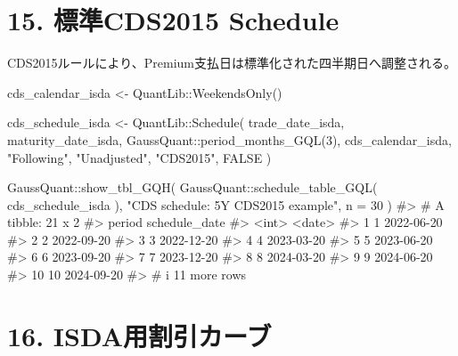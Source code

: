 \documentclass[
  letterpaper,
  DIV=11,
  numbers=noendperiod]{scrreprt}
\newenvironment{Shaded}{\begin{snugshade}}{\end{snugshade}}
\newcommand{\AttributeTok}[1]{\textcolor[rgb]{0.40,0.45,0.13}{#1}}
\newcommand{\CommentTok}[1]{\textcolor[rgb]{0.37,0.37,0.37}{#1}}
\newcommand{\ConstantTok}[1]{\textcolor[rgb]{0.56,0.35,0.01}{#1}}
\newcommand{\DecValTok}[1]{\textcolor[rgb]{0.68,0.00,0.00}{#1}}
\newcommand{\FunctionTok}[1]{\textcolor[rgb]{0.28,0.35,0.67}{#1}}
\newcommand{\NormalTok}[1]{\textcolor[rgb]{0.00,0.23,0.31}{#1}}
\newcommand{\OtherTok}[1]{\textcolor[rgb]{0.00,0.23,0.31}{#1}}
\newcommand{\SpecialCharTok}[1]{\textcolor[rgb]{0.37,0.37,0.37}{#1}}
\newcommand{\StringTok}[1]{\textcolor[rgb]{0.13,0.47,0.30}{#1}}
\begin{document}
\section{15. 標準CDS2015 Schedule}\label{ux6a19ux6e96cds2015-schedule}

CDS2015ルールにより、Premium支払日は標準化された四半期日へ調整される。

\begin{Shaded}
\begin{Highlighting}[]
\NormalTok{cds\_calendar\_isda }\OtherTok{\textless{}{-}}\NormalTok{ QuantLib}\SpecialCharTok{::}\FunctionTok{WeekendsOnly}\NormalTok{()}

\NormalTok{cds\_schedule\_isda }\OtherTok{\textless{}{-}}\NormalTok{ QuantLib}\SpecialCharTok{::}\FunctionTok{Schedule}\NormalTok{(}
\NormalTok{  trade\_date\_isda,}
\NormalTok{  maturity\_date\_isda,}
\NormalTok{  GaussQuant}\SpecialCharTok{::}\FunctionTok{period\_months\_GQL}\NormalTok{(}\DecValTok{3}\NormalTok{),}
\NormalTok{  cds\_calendar\_isda,}
  \StringTok{"Following"}\NormalTok{,}
  \StringTok{"Unadjusted"}\NormalTok{,}
  \StringTok{"CDS2015"}\NormalTok{,}
  \ConstantTok{FALSE}
\NormalTok{)}

\NormalTok{GaussQuant}\SpecialCharTok{::}\FunctionTok{show\_tbl\_GQH}\NormalTok{(}
\NormalTok{  GaussQuant}\SpecialCharTok{::}\FunctionTok{schedule\_table\_GQL}\NormalTok{(}
\NormalTok{    cds\_schedule\_isda}
\NormalTok{  ),}
  \StringTok{"CDS schedule: 5Y CDS2015 example"}\NormalTok{,}
  \AttributeTok{n =} \DecValTok{30}
\NormalTok{)}
\CommentTok{\#\textgreater{} \# A tibble: 21 x 2}
\CommentTok{\#\textgreater{}    period schedule\_date}
\CommentTok{\#\textgreater{}     \textless{}int\textgreater{} \textless{}date\textgreater{}       }
\CommentTok{\#\textgreater{}  1      1 2022{-}06{-}20   }
\CommentTok{\#\textgreater{}  2      2 2022{-}09{-}20   }
\CommentTok{\#\textgreater{}  3      3 2022{-}12{-}20   }
\CommentTok{\#\textgreater{}  4      4 2023{-}03{-}20   }
\CommentTok{\#\textgreater{}  5      5 2023{-}06{-}20   }
\CommentTok{\#\textgreater{}  6      6 2023{-}09{-}20   }
\CommentTok{\#\textgreater{}  7      7 2023{-}12{-}20   }
\CommentTok{\#\textgreater{}  8      8 2024{-}03{-}20   }
\CommentTok{\#\textgreater{}  9      9 2024{-}06{-}20   }
\CommentTok{\#\textgreater{} 10     10 2024{-}09{-}20   }
\CommentTok{\#\textgreater{} \# i 11 more rows}
\end{Highlighting}
\end{Shaded}

\section{16.
ISDA用割引カーブ}\label{isdaux7528ux5272ux5f15ux30abux30fcux30d6}
\end{document}

